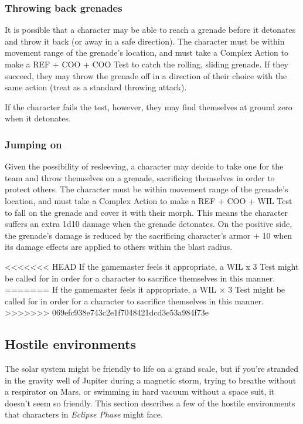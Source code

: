 \subsubsection{Throwing back grenades}

It is possible that a character may be able to reach a grenade before it detonates and throw it back (or away in a safe direction). The character must be within movement range of the grenade’s location, and must take a Complex Action to make a REF + COO + COO Test to catch the rolling, sliding grenade. If they succeed, they may throw the grenade off in a direction of their choice with the same action (treat as a standard throwing attack).

If the character fails the test, however, they may find themselves at ground zero when it detonates.

\subsubsection{Jumping on}

Given the possibility of resleeving, a character may decide to take one for the team and throw themselves on a grenade, sacrificing themselves in order to protect others. The character must be within movement range of the grenade’s location, and must take a Complex Action to make a REF + COO + WIL Test to fall on the grenade and cover it with their morph. This means the character suffers an extra 1d10 damage when the grenade detonates. On the positive side, the grenade’s damage is reduced by the sacrificing character’s armor + 10 when its damage effects are applied to others within the blast radius.

<<<<<<< HEAD
If the gamemaster feels it appropriate, a WIL x 3 Test might be called for in order for a character to sacrifice themselves in this manner.
=======
If the gamemaster feels it appropriate, a WIL $\times$ 3 Test might be called for in order for a character to sacrifice themselves in this manner.
>>>>>>> 069efc938e743c2e1f7048421dcd3e53a984f73e

\subsection{Hostile environments}
\label{sec:hostile-environments} The solar system might be friendly to life on a grand scale, but if you’re stranded in the gravity well of Jupiter during a magnetic storm, trying to breathe without a respirator on Mars, or swimming in hard vacuum without a space suit, it doesn’t seem so friendly. This section describes a few of the hostile environments that characters in \emph{Eclipse Phase} might face.


